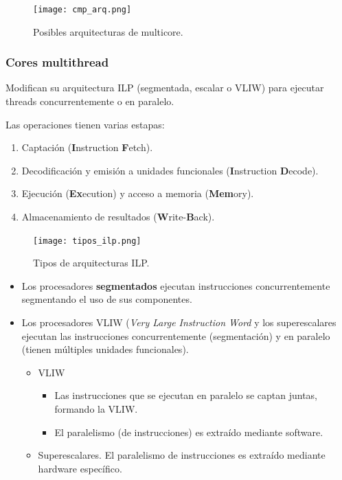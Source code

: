 \documentclass[12pt,spanish]{article}
\begin{document}
\begin{figure}[H]
\centering
\texttt{[image: cmp\_arq.png]}
\caption{Posibles arquitecturas de multicore.}
\end{figure}


\subsubsection{Cores multithread}

Modifican su arquitectura ILP (segmentada, escalar o VLIW) para ejecutar threads concurrentemente o en paralelo.

Las operaciones tienen varias estapas:
\begin{enumerate}
	\item Captación (\textbf{I}nstruction \textbf{F}etch).
	\item Decodificación y emisión a unidades funcionales (\textbf{I}nstruction \textbf{D}ecode).
	\item Ejecución (\textbf{Ex}ecution) y acceso a memoria (\textbf{Mem}ory).
	\item Almacenamiento de resultados (\textbf{W}rite-\textbf{B}ack).
\end{enumerate}

\begin{figure}[H]
\centering
\texttt{[image: tipos\_ilp.png]}
\caption{Tipos de arquitecturas ILP.}
\end{figure}

\begin{itemize}
	\item Los procesadores \textbf{segmentados} ejecutan instrucciones concurrentemente segmentando el uso de sus componentes.
	\item Los procesadores VLIW (\textit{Very Large Instruction Word} y los superescalares ejecutan las instrucciones concurrentemente (segmentación) y en paralelo (tienen múltiples unidades funcionales).
		\begin{itemize}
			\item VLIW
				\begin{itemize}
					\item Las instrucciones que se ejecutan en paralelo se captan juntas, formando la VLIW.
					\item El paralelismo (de instrucciones) es extraído mediante software.
				\end{itemize}
				\item Superescalares. El paralelismo de instrucciones es extraído mediante hardware específico.
		\end{itemize}
\end{itemize}
\end{document}
